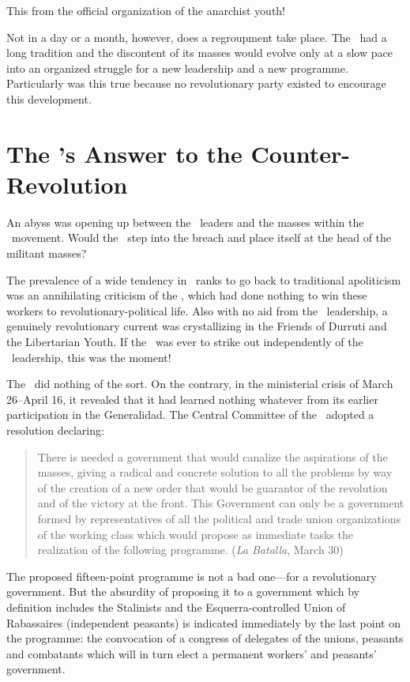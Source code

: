 This from the official organization of the anarchist youth!

Not in a day or a month, however, does a regroupment take place. The \CNT\ had a long tradition and the discontent of its masses would evolve only at a slow pace into an organized struggle for a new leadership and a new programme. Particularly was this true because no revolutionary party existed to encourage this development.

\section{The \POUM’s Answer to the Counter-Revolution}

An abyss was opening up between the \CNT\ leaders and the masses within the \CNT\ movement. Would the \POUM\ step into the breach and place itself at the head of the militant masses?

The prevalence of a wide tendency in \CNT\ ranks to go back to traditional apoliticism was an annihilating criticism of the \POUM, which had done nothing to win these workers to revolutionary-political life. Also with no aid from the \POUM\ leadership, a genuinely revolutionary current was crystallizing in the Friends of Durruti and the Libertarian Youth. If the \POUM\ was ever to strike out independently of the \CNT\ leadership, this was the moment!

The \POUM\ did nothing of the sort. On the contrary, in the ministerial crisis of March 26--April 16, it revealed that it had learned nothing whatever from its earlier participation in the Generalidad. The Central Committee of the \POUM\ adopted a resolution declaring:

\begin{quotation}
  There is needed a government that would canalize the aspirations of the masses, giving a radical and concrete solution to all the problems by way of the creation of a new order that would be guarantor of the revolution and of the victory at the front. This Government can only be a government formed by representatives of all the political and trade union organizations of the working class which would propose as immediate tasks the realization of the following programme. (\emph{La Batalla}, March 30)
\end{quotation}

The proposed fifteen-point programme is not a bad one---for a revolutionary government. But the absurdity of proposing it to a government which by definition includes the Stalinists and the Esquerra-controlled Union of Rabassaires (independent peasants) is indicated immediately by the last point on the programme: the convocation of a congress of delegates of the unions, peasants and combatants which will in turn elect a permanent workers’ and peasants’ government.


